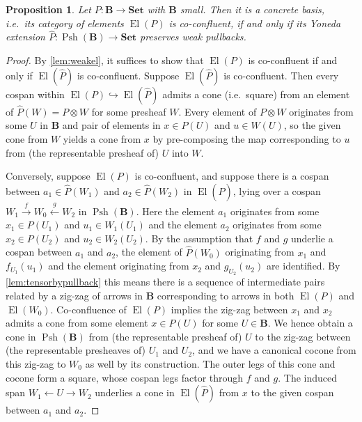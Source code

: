 \documentclass[11pt, oneside, article]{memoir}
\theoremstyle{plain}
\newtheorem{proposition}[theorem]{Proposition}
\theoremstyle{definition}
\theoremstyle{remark}
\DeclareMathOperator{\Psh}{Psh}
\DeclareMathOperator{\El}{El}
\newcommand{\ot}{\leftarrow}
\newcommand{\xto}[1]{\xrightarrow{#1}}
\newcommand{\xot}[1]{\xleftarrow{#1}}
\newcommand{\namedcat}[1]{\mathbf{#1}}
\newcommand{\cat}[1]{\mathbf{#1}}
\newcommand{\Set}{\namedcat{Set}}
\newcommand{\extend}[1]{\widehat{#1}}
\newcommand{\ph}[1]{#1}
\newcommand{\Ps}[1]{\Psh(#1)}
\newcommand{\xU}{U}
\newcommand{\bB}{\cat{B}}
\newcommand{\pP}{\ph{P}}
\begin{document}
\begin{proposition}\label{prop:influent}
  Let $\pP \colon \bB \to \Set$ with $\bB$ small. Then it is a
  concrete basis, i.e.\ its category of elements $\El(\pP)$ is
  co-confluent, if and only if its Yoneda extension
  $\extend{\pP} \colon \Ps{\bB} \to \Set$ preserves weak pullbacks.
\end{proposition}
\begin{proof}
  By \cref{lem:weakel}, it suffices to show that $\El(\pP)$ is
  co-confluent if and only if $\El(\extend{\pP})$ is co-confluent.
  Suppose $\El(\extend{\pP})$ is co-confluent. Then every cospan
  within $\El(\pP) \hookrightarrow \El(\extend{\pP})$ admits a cone
  (i.e.\ square) from an element of $\extend{\pP}(W) = \pP \otimes W$
  for some presheaf $W$. Every element of $\pP \otimes W$ originates
  from some $\xU$ in $\bB$ and pair of elements in $x \in \pP(\xU)$ and
  $u \in W(\xU)$, so the given cone from $W$ yields a cone from $x$ by
  pre-composing the map corresponding to $u$ from (the representable
  presheaf of) $\xU$ into $W$.

  Conversely, suppose $\El(\pP)$ is co-confluent, and suppose there is
  a cospan between $a_1 \in \extend{\pP}(W_1)$ and
  $a_2 \in \extend{\pP}(W_2)$ in $\El(\extend{\pP})$, lying over a
  cospan $W_1 \xto{f} W_0 \xot{g} W_2$ in $\Ps{\bB}$. Here the element
  $a_1$ originates from some $x_1 \in \pP(\xU_1)$ and
  $u_1 \in W_1(\xU_1)$ and the element $a_2$ originates from some
  $x_2 \in \pP(\xU_2)$ and $u_2 \in W_2(\xU_2)$. By the assumption
  that $f$ and $g$ underlie a cospan between $a_1$ and $a_2$, the
  element of $\extend{\pP}(W_0)$ originating from $x_1$ and
  $f_{\xU_1}(u_1)$ and the element originating from $x_2$ and
  $g_{\xU_2}(u_2)$ are identified. By \cref{lem:tensorbypullback} this
  means there is a sequence of intermediate pairs related by a zig-zag
  of arrows in $\bB$ corresponding to arrows in both $\El(\pP)$ and
  $\El(W_0)$. Co-confluence of $\El(\pP)$ implies the zig-zag between
  $x_1$ and $x_2$ admits a cone from some element $x \in \pP(\xU)$ for
  some $\xU \in \bB$. We hence obtain a cone in $\Ps{\bB}$ from (the
  representable presheaf of) $\xU$ to the zig-zag between (the
  representable presheaves of) $\xU_1$ and $\xU_2$, and we have a
  canonical cocone from this zig-zag to $W_0$ as well by its
  construction. The outer legs of this cone and cocone form a square,
  whose cospan legs factor through $f$ and $g$. The induced span
  $W_1 \ot \xU \to W_2$ underlies a cone in $\El(\extend{\pP})$ from
  $x$ to the given cospan between $a_1$ and $a_2$.
\end{proof}
\end{document}
